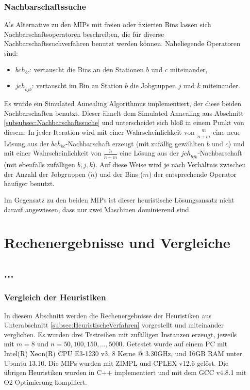 \documentclass{scrreprt}
\begin{document}
\subsection{Nachbarschaftssuche}
Als Alternative zu den MIPs mit freien oder fixierten Bins lassen sich Nachbarschaftsoperatoren beschreiben, 
die für diverse Nachbarschaftssuchverfahren benutzt werden können.
Naheliegende Operatoren sind:
\begin{itemize}
    \item $\mathit{bch}_{bc}$: vertauscht die Bins an den Stationen $b$ und $c$ miteinander,
    \item $\mathit{jch}_{bjk}$: vertauscht im Bin an Station $b$ die Jobgruppen $j$ und $k$ miteinander.
\end{itemize}
Es wurde ein Simulated Annealing Algorithmus implementiert, der diese beiden Nachbarschaften benutzt.
Dieser ähnelt dem Simulated Annealing aus Abschnitt \ref{subsubsec:Nachbarschaftssuche} und unterscheidet sich bloß in einem Punkt von diesem:
In jeder Iteration wird mit einer Wahrscheinlichkeit von $\frac{m}{\tilde{n}+m}$ eine neue Lösung aus der $\mathit{bch}_{bc}$-Nachbarschaft erzeugt 
(mit zufällig gewählten $b$ und $c$) und mit einer Wahrscheinlichkeit von $\frac{\tilde{n}}{\tilde{n}+m}$ eine Lösung aus der $\mathit{jch}_{bjk}$-Nachbarschaft
(mit ebenfalls zufälligen $b,j,k$).
Auf diese Weise wird je nach Verhältnis zwischen der Anzahl der Jobgruppen ($\tilde{n}$) und der Bins ($m$) der entsprechende Operator häufiger benutzt.

Im Gegensatz zu den beiden MIPs ist dieser heuristische Lösungsansatz nicht darauf angewiesen, dass nur zwei Maschinen dominierend sind.


\chapter{Rechenergebnisse und Vergleiche}
\label{chap:RechenergebnisseUndVergleiche}

\section{...}

\subsection{Vergleich der Heuristiken}
\label{subsec:VergleichDerHeuristiken}
In diesem Abschnitt werden die Rechenergebnisse der Heuristiken aus Unterabschnitt \ref{subsec:HeuristischeVerfahren} vorgestellt und miteinander verglichen.
Es wurden drei Testreihen mit zufälligen Instanzen erzeugt, jeweils mit $m=8$ und $n=50,100,150,\ldots,5000$.
Getestet wurde auf einem PC mit Intel(R) Xeon(R) CPU E3-1230 v3, 8 Kerne @ 3.30GHz, und 16GB RAM unter Ubuntu 13.10.
Die MIPs wurden mit ZIMPL \cite{Koch2004} und CPLEX v12.6 gelöst.
Die übrigen Heuristiken wurden in C++ implementiert und mit dem GCC v4.8.1 mit O2-Optimierung kompiliert.
\end{document}
